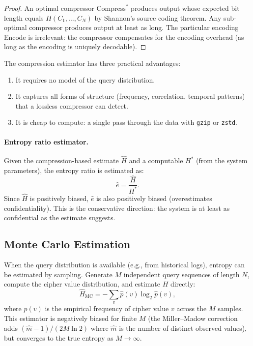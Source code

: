 \documentclass[11pt]{article}
\theoremstyle{definition}
\theoremstyle{plain}
\theoremstyle{remark}
\begin{document}
\begin{proof}
An optimal compressor $\mathrm{Compress}^*$ produces output whose
expected bit length equals $H(C_1, \ldots, C_N)$ by Shannon's source
coding theorem.  Any sub-optimal compressor produces output at least as
long.  The particular encoding $\mathrm{Encode}$ is irrelevant: the
compressor compensates for the encoding overhead (as long as the encoding
is uniquely decodable).
\end{proof}

The compression estimator has three practical advantages:
\begin{enumerate}
\item It requires no model of the query distribution.
\item It captures all forms of structure (frequency, correlation,
  temporal patterns) that a lossless compressor can detect.
\item It is cheap to compute: a single pass through the data with
  \texttt{gzip} or \texttt{zstd}.
\end{enumerate}

\paragraph{Entropy ratio estimator.}
Given the compression-based estimate $\hat{H}$ and a computable
$H^*$ (from the system parameters), the entropy ratio is estimated as:
\begin{equation}
\hat{e} = \frac{\hat{H}}{H^*}.
\end{equation}
Since $\hat{H}$ is positively biased, $\hat{e}$ is also positively
biased (overestimates confidentiality).  This is the conservative
direction: the system is at least as confidential as the estimate suggests.

\subsection{Monte Carlo Estimation}

When the query distribution is available (e.g., from historical logs),
entropy can be estimated by sampling.  Generate $M$ independent query
sequences of length $N$, compute the cipher value distribution, and
estimate $H$ directly:
\begin{equation}
\hat{H}_{\mathrm{MC}} = -\sum_v \hat{p}(v) \log_2 \hat{p}(v),
\end{equation}
where $\hat{p}(v)$ is the empirical frequency of cipher value $v$ across
the $M$ samples.  This estimator is negatively biased for finite $M$
(the Miller--Madow correction adds $(\hat{m} - 1) / (2M \ln 2)$ where
$\hat{m}$ is the number of distinct observed values), but converges to
the true entropy as $M \to \infty$.
\end{document}
